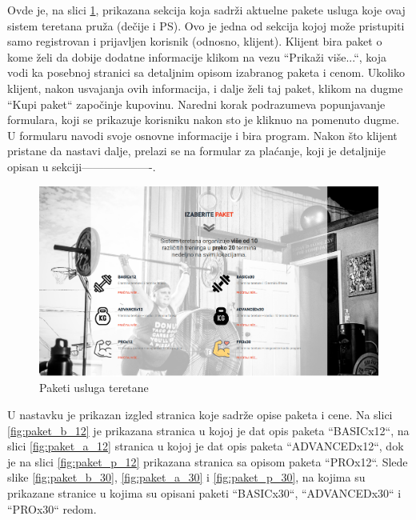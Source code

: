 \documentclass[../main.tex]{subfiles}
\begin{document}
Ovde je, na slici \ref{fig:paketi_teretane}, prikazana sekcija koja sadrži aktuelne pakete usluga koje ovaj sistem teretana pruža (dečije i PS). Ovo je jedna od sekcija kojoj može pristupiti samo registrovan i prijavljen korisnik (odnosno, klijent). Klijent bira paket o kome želi da dobije dodatne informacije klikom na vezu ``Prikaži više...``, koja vodi ka posebnoj stranici sa detaljnim opisom izabranog paketa i cenom. Ukoliko klijent, nakon usvajanja ovih informacija, i dalje želi taj paket, klikom na dugme ``Kupi paket`` započinje kupovinu. Naredni korak podrazumeva popunjavanje formulara, koji se prikazuje korisniku nakon sto je kliknuo na pomenuto dugme. U formularu navodi svoje osnovne informacije i bira program. Nakon što klijent pristane da nastavi dalje, prelazi se na formular za plaćanje, koji je detaljnije opisan u sekciji-------------------.

\begin{figure}[!ht]
\begin{center}
\includegraphics[scale=0.22]{sections/korisnicki_interfejs/screenshots/paketi_teretane.png}
\end{center}
\caption{Paketi usluga teretane}
\label{fig:paketi_teretane}
\end{figure}

U nastavku je prikazan izgled stranica koje sadrže opise paketa i cene. Na slici \ref{fig:paket_b_12} je prikazana stranica u kojoj je dat opis paketa ``BASICx12``, na slici \ref{fig:paket_a_12} stranica u kojoj je dat opis paketa ``ADVANCEDx12``, dok je na slici \ref{fig:paket_p_12} prikazana stranica sa opisom paketa ``PROx12``. Slede slike \ref{fig:paket_b_30}, \ref{fig:paket_a_30} i \ref{fig:paket_p_30}, na kojima su prikazane stranice u kojima su opisani paketi ``BASICx30``, ``ADVANCEDx30`` i ``PROx30`` redom.
\end{document}
